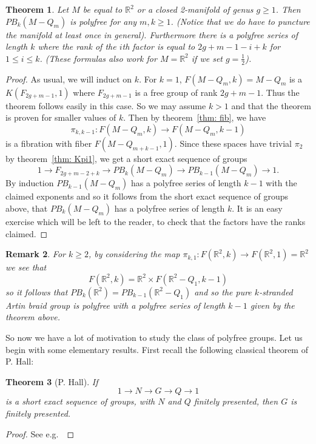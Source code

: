 \documentclass{amsart}
\newtheorem{thm}{Theorem}[section]
\newtheorem{rem}[thm]{Remark}
\begin{document}
\begin{thm}
\label{thm: motpoly}
Let $M$ be equal to $\mathbb{R}^2$ or a closed 2-manifold of genus $g \geq 1$. 
Then $PB_k(M-Q_m)$ is polyfree for any $m,k \geq 1$. (Notice that
we do have to puncture the manifold at least once in general). Furthermore
there is a polyfree series of length $k$ where the rank of the $i$th factor
is equal to 
$2g+m-1 -i + k$ for $1 \leq i \leq k$. (These formulas also work for 
$M=\mathbb{R}^2$ if we set $g=\frac{1}{2}$).
\end{thm}
\begin{proof}
As usual, we will induct on $k$. For $k=1$, $F(M-Q_m,k)=M-Q_m$ is a
$K(F_{2g+m-1},1)$ where $F_{2g + m - 1}$ is a free group of rank $2g+m-1$. 
Thus the theorem
follows easily in this case. So we may assume $k>1$ and that the theorem
is proven for smaller values of $k$. Then by theorem~\ref{thm: fib}, we
have
$$
\pi_{k,k-1} : F(M-Q_m,k) \rightarrow F(M-Q_m,k-1)
$$
is a fibration with fiber $F(M-Q_{m+k-1},1)$. Since these spaces have
trivial $\pi_2$ by theorem~\ref{thm: Kpi1}, we get a short exact sequence
of groups
$$
1 \rightarrow F_{2g + m - 2 + k} \rightarrow PB_k(M-Q_m) \rightarrow
PB_{k-1}(M-Q_m) \rightarrow 1.
$$
By induction $PB_{k-1}(M-Q_m)$ has a polyfree series of length $k-1$
with the claimed exponents and so it follows from the short exact sequence of 
groups above, that
$PB_k(M-Q_m)$ has a polyfree series of length $k$. It is an easy exercise
which will be left to the reader, to check that the factors have the ranks 
claimed.
\end{proof}

\begin{rem}
For $k \geq 2$, by considering the map 
$\pi_{k,1} : F(\mathbb{R}^2,k) \rightarrow 
F(\mathbb{R}^2,1)=\mathbb{R}^2$ we see that 
$$
F(\mathbb{R}^2,k) = \mathbb{R}^2 \times F(\mathbb{R}^2-Q_1,k-1)
$$
so it follows that $PB_k(\mathbb{R}^2)=PB_{k-1}(\mathbb{R}^2-Q_1)$
and so the pure $k$-stranded Artin braid group is polyfree with a polyfree 
series
of length $k-1$ given by the theorem above.
\end{rem}

So now we have a lot of motivation to study the class of polyfree groups.
Let us begin with some elementary results.
First recall the following classical theorem of P. Hall:

\begin{thm}[P. Hall]
\label{thm: Hall}
If 
$$
1 \rightarrow N \rightarrow G \rightarrow Q \rightarrow 1 
$$
is a short exact sequence of groups, with $N$ and $Q$ finitely presented,
then $G$ is finitely presented.
\end{thm}
\begin{proof}
See e.g.~\cite{Robin}
\end{proof}
\end{document}
